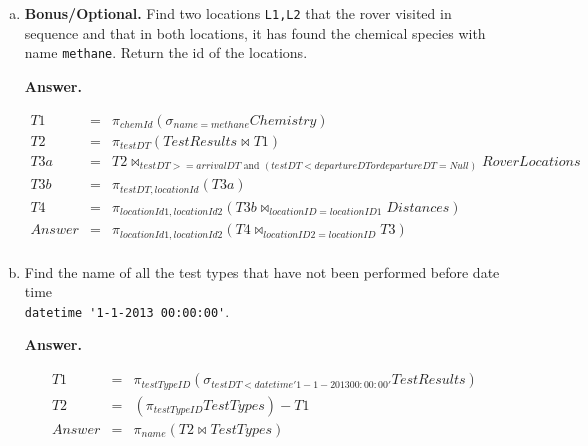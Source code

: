 \documentclass[11pt]{article}
\begin{document}
\begin{enumerate} [(a)]
\item {\bf Bonus/Optional.} Find two locations \verb+L1,L2+ that the
  rover visited in sequence and that in both locations, it has found
  the chemical species with name \verb+methane+. Return the id of the
  locations.

{\bf Answer.}

\begin{eqnarray*}
T1 & = & \pi_{chemId} (\sigma_{name=methane} Chemistry) \\
T2 & = & \pi_{testDT} (TestResults \bowtie T1) \\
T3a & = & T2 \bowtie_{testDT >= arrivalDT \mbox{ and } (testDT < departureDT or departureDT=Null)} RoverLocations \\
T3b & = & \pi_{testDT, locationId} (T3a) \\
T4 & = & \pi_{locationId1,locationId2} (T3b \bowtie_{locationID=locationID1} Distances) \\
Answer & = & \pi_{locationId1,locationId2} (T4 \bowtie_{locationID2=locationID} T3) \\
\end{eqnarray*}

\item Find the name of all the test types that have not been performed
  before date time\\
 \verb+datetime '1-1-2013 00:00:00'+.

{\bf Answer.}

\begin{eqnarray*}
T1 & = & \pi_{testTypeID} (\sigma_{testDT < datetime '1-1-2013 00:00:00'} TestResults) \\
T2 & = & (\pi_{testTypeID} TestTypes) - T1 \\
Answer & = & \pi_{name} ( T2 \bowtie TestTypes)
\end{eqnarray*}

\end{enumerate}
\end{document}
